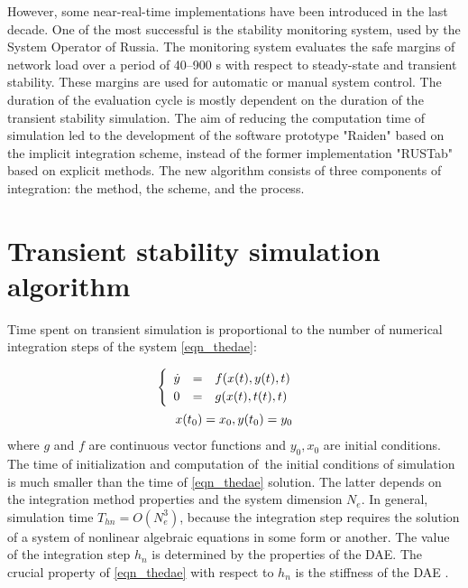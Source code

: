 \documentclass[lettersize,journal]{IEEEtran}
\begin{document}
However, some near-real-time implementations have been introduced in the last decade. One of the most successful is the stability monitoring system, used by the System Operator of Russia. The monitoring system evaluates the safe margins of network load over a period of 40–900 s with respect to steady-state and transient stability. These margins are used for automatic or manual system control. The duration of the evaluation cycle is mostly dependent on the duration of the transient stability simulation. The aim of reducing the computation time of simulation led to the development of the software prototype "Raiden" based on the implicit integration scheme, instead of the former implementation "RUSTab" based on explicit methods. The new algorithm consists of three components of integration: the method, the scheme, and the process. 
\section{Transient stability simulation algorithm}
Time spent on transient simulation is proportional to the number of numerical integration steps of the system \eqref{eqn_thedae}: 

\begin{equation}
	\label{eqn_thedae}
	\begin{array}{c}
		\begin{cases}
			\begin{array}{lcl}
				\dot{y}&=&f(x(t), y(t), t) \\
			 	      0&=&g(x(t), t(t), t)\\
			\end{array}
		\end{cases} 
	\vspace{0.5em} \\
	 x(t_0)=x_0, y(t_0)=y_0 \\
	\end{array}
\end{equation}
\noindent where \(g\) and \(f\) are continuous vector functions and \(y_0, x_0\) are initial conditions. The time of initialization and computation of the initial conditions of simulation is much smaller than the time of \eqref{eqn_thedae} solution. The latter depends on the integration method properties and the system dimension \(N_e\). In general, simulation time \(T_{hn}=O(N_e^3)\), because the integration step requires the solution of a system of nonlinear algebraic equations in some form or another. The value of the integration step \(h_n\) is determined by the properties of the DAE. The crucial property of \eqref{eqn_thedae} with respect to \(h_n\) is the stiffness of the DAE \cite{hairer93}. 
\end{document}

